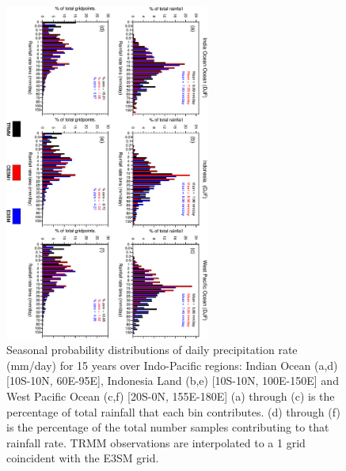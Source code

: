 \documentclass[draft,ms]{AGUTeX}
\begin{document}
\begin{article}
\
\begin{figure}[fp]
  \begin{center}
    \noindent\includegraphics[width=0.6\textwidth,angle=90.]{./figs/f_pdf_PRECT.pdf}
  \end{center}
  \caption{Seasonal probability distributions of daily precipitation rate (mm/day) for 15 years over Indo-Pacific regions: Indian Ocean (a,d) [10\deg S-10\deg N, 60\deg E-95\deg E], Indonesia Land (b,e) [10\deg S-10\deg N, 100\deg E-150\deg E] and West Pacific Ocean (c,f) [20\deg S-0\deg N, 155E-180E] (a) through (c) is the percentage of total rainfall that each bin contributes. (d) through (f) is the percentage of the total number samples contributing to that rainfall rate. TRMM observations are interpolated to a 1\deg$ $ grid coincident with the E3SM grid.} 
\label{f_pdf_PRECT}
\end{figure}


\end{article}
\end{document}
